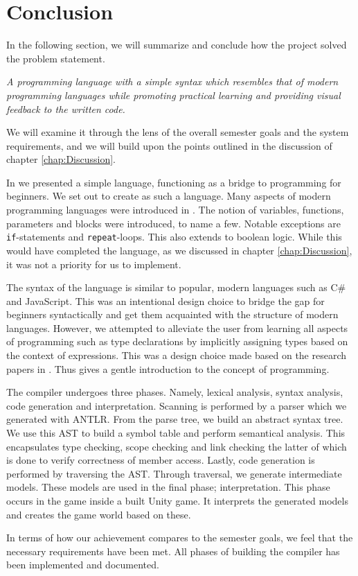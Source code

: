\chapter{Conclusion}\label{chap:conclusion}

In the following section, we will summarize and conclude how the project solved the problem statement.

\vspace{5mm}
\textit{A programming language with a simple syntax which resembles that of modern programming languages while promoting practical learning and providing visual feedback to the written code.}
\vspace{5mm}

We will examine it through the lens of the overall semester goals and the system requirements, and we will build upon the points outlined in the discussion of chapter \ref{chap:Discussion}.

In  we presented a simple language, functioning as a bridge to programming for beginners. We set out to create \dazel{} as such a language.
Many aspects of modern programming languages were introduced in \dazel{}. The notion of variables, functions, parameters and blocks were introduced, to name a few. Notable exceptions are \texttt{if}-statements and \texttt{repeat}-loops. This also extends to boolean logic. While this would have completed the language, as we discussed in chapter \ref{chap:Discussion}, it was not a priority for us to implement. 

The syntax of the language is similar to popular, modern languages such as C\# and JavaScript.
This was an intentional design choice to bridge the gap for beginners syntactically and get them acquainted with the structure of modern languages. 
However, we attempted to alleviate the user from learning all aspects of programming such as type declarations by implicitly assigning types based on the context of expressions. 
This was a design choice made based on the research papers in . 
Thus \dazel{} gives a gentle introduction to the concept of programming.

The \dazel{} compiler undergoes three phases. Namely, lexical analysis, syntax analysis, code generation and interpretation. Scanning is performed by a parser which we generated with ANTLR. From the parse tree, we build an abstract syntax tree. We use this AST to build a symbol table and perform semantical analysis. This encapsulates type checking, scope checking and link checking the latter of which is done to verify correctness of member access. Lastly, code generation is performed by traversing the AST. Through traversal, we generate intermediate models. These models are used in the final phase; interpretation. This phase occurs in the \dazel{} game inside a built Unity game. It interprets the generated models and creates the game world based on these.

In terms of how our achievement compares to the semester goals, we feel that the necessary requirements have been met. All phases of building the compiler has been implemented and documented.